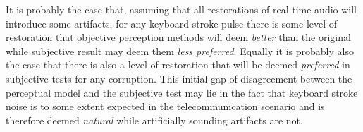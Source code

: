 It is probably the case that, assuming that all restorations of real time audio will introduce some artifacts, for any keyboard stroke pulse there is some level of restoration that objective perception methods will deem \emph{better} than the original while subjective result may deem them \emph{less preferred}. Equally it is probably also the case that there is also a level of restoration that will be deemed \emph{preferred} in subjective tests for any corruption. This initial gap of disagreement between the perceptual model and the subjective test may lie in the fact that keyboard stroke noise is to some extent expected in the telecommunication scenario and is therefore deemed \emph{natural} while artificially sounding artifacts are not.





